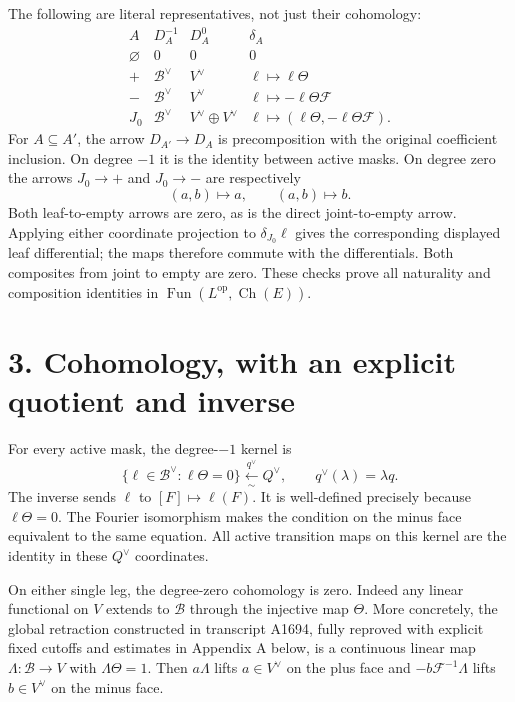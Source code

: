\documentclass[10pt,a4paper,oneside]{report}
\begin{document}
The following are literal representatives, not just their cohomology: \[
\begin{array}{c|c|c|c}
A&D_A^{-1}&D_A^0&\delta_A\\ \hline
\varnothing&0&0&0\\
+&\mathscr B^\vee&V^\vee&\ell\mapsto\ell\Theta\\
-&\mathscr B^\vee&V^\vee&\ell\mapsto-\ell\Theta\mathcal F\\
J_0&\mathscr B^\vee&V^\vee\oplus V^\vee&
\ell\mapsto(\ell\Theta,-\ell\Theta\mathcal F).
\end{array}
\] For \(A\subseteq A'\), the arrow \(D_{A'}\to D_A\) is precomposition
with the original coefficient inclusion. On degree \(-1\) it is the
identity between active masks. On degree zero the arrows \(J_0\to+\) and
\(J_0\to-\) are respectively \[
(a,b)\mapsto a,\qquad(a,b)\mapsto b.
\] Both leaf-to-empty arrows are zero, as is the direct joint-to-empty
arrow. Applying either coordinate projection to \(\delta_{J_0}\ell\)
gives the corresponding displayed leaf differential; the maps therefore
commute with the differentials. Both composites from joint to empty are
zero. These checks prove all naturality and composition identities in
\(\operatorname{Fun}(L^{\mathrm{op}},\operatorname{Ch}(E))\).

\section{3. Cohomology, with an explicit quotient and
inverse}\label{proof03:cohomology-with-an-explicit-quotient-and-inverse}

For every active mask, the degree-\(-1\) kernel is \[
\{\ell\in\mathscr B^\vee:\ell\Theta=0\}
\xleftarrow[\sim]{q^\vee}Q^\vee,
\qquad q^\vee(\lambda)=\lambda q.
\] The inverse sends \(\ell\) to \([F]\mapsto\ell(F)\). It is
well-defined precisely because \(\ell\Theta=0\). The Fourier isomorphism
makes the condition on the minus face equivalent to the same equation.
All active transition maps on this kernel are the identity in these
\(Q^\vee\) coordinates.

On either single leg, the degree-zero cohomology is zero. Indeed any
linear functional on \(V\) extends to \(\mathscr B\) through the
injective map \(\Theta\). More concretely, the global retraction
constructed in transcript A1694, fully reproved with explicit fixed
cutoffs and estimates in Appendix A below, is a continuous linear map
\(\Lambda:\mathscr B\to V\) with \(\Lambda\Theta=1\). Then \(a\Lambda\)
lifts \(a\in V^\vee\) on the plus face and \(-b\mathcal F^{-1}\Lambda\)
lifts \(b\in V^\vee\) on the minus face.
\end{document}
